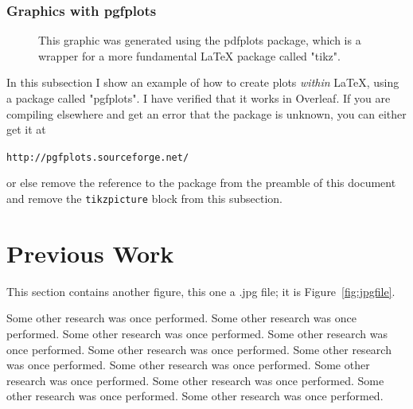 \documentclass[11pt]{ucscthesisbs}
\begin{document}
\subsection{Graphics with pgfplots}


\begin{figure}\label{agraphic}
\centering
{}
\caption{This graphic was generated using the pdfplots package, which is a wrapper for a more fundamental LaTeX package called "tikz".  }
\end{figure}

In this subsection I show an example of how to create plots {\it within} LaTeX, using a package called "pgfplots".  I have verified that it works in Overleaf.  If you are compiling elsewhere and get an error that the package is unknown, you can either get it at 
\begin{center}
{\tt http://pgfplots.sourceforge.net/}
\end{center}
or else remove the reference to the package from the preamble of this document and remove the {\tt tikzpicture} block from this subsection.



\chapter{Previous Work}

This section contains another figure, this one a .jpg file; it is Figure~\ref{fig:jpgfile}.

Some other research was once performed.
Some other research was once performed.
Some other research was once performed.
Some other research was once performed.
Some other research was once performed.
Some other research was once performed.
Some other research was once performed.
Some other research was once performed.
Some other research was once performed.
Some other research was once performed.
Some other research was once performed.
\end{document}
